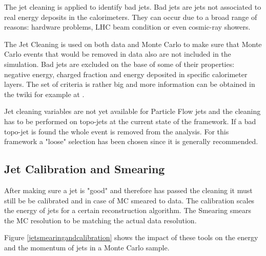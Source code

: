 The jet cleaning is applied to identify bad jets. Bad jets are jets not associated to real energy deposits in the calorimeters. They can occur due to a broad range of reasons: hardware problems, LHC beam condition or even cosmic-ray showers.

The Jet Cleaning is used on both data and Monte Carlo to make sure that Monte Carlo events that would be removed in data also are not included in the simulation.
Bad jets are excluded on the base of some of their properties: negative energy, charged fraction and energy deposited in specific calorimeter layers. The set of criteria is rather big and more information can be obtained in the twiki for example at \cite{jetcleaning}.

Jet cleaning variables are not yet available for Particle Flow jets and the cleaning has to be performed on topo-jets at the current state of the framework. If a bad topo-jet is found the whole event is removed from the analysis.
For this framework a "loose" \cite{jetcleaning} selection has been chosen since it is generally recommended.

\subsection{Jet Calibration and Smearing}

After making sure a jet is "good" and therefore has passed the cleaning it must still be be calibrated and in case of MC smeared to data. The calibration scales the energy of jets for a certain reconstruction algorithm. The Smearing smears the MC resolution to be matching the actual data resolution.

Figure \ref{jetsmearingandcalibration} shows the impact of these tools on the energy and the momentum of jets in a Monte Carlo sample.


